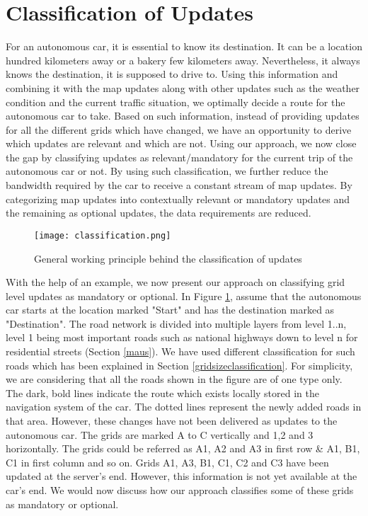 \section{Classification of Updates} \label{classificationofupdates}
For an autonomous car, it is essential to know its destination. It can be a location hundred kilometers away or a bakery few kilometers away. Nevertheless, it always knows the destination, it is supposed to drive to. Using this information and combining it with the map updates along with other updates such as the weather condition and the current traffic situation, we optimally decide a route for the autonomous car to take. Based on such information, instead of providing updates for all the different grids which have changed, we have an opportunity to derive which updates are relevant and which are not. Using our approach, we now close the gap by classifying updates as relevant/mandatory for the current trip of the autonomous car or not. By using such classification, we further reduce the bandwidth required by the car to receive a constant stream of map updates. By categorizing map updates into contextually relevant or mandatory updates and the remaining as optional updates, the data requirements are reduced. \\

\begin{figure}
\centering
\texttt{[image: classification.png]}
\caption{General working principle behind the classification of updates}
\label{fg:classificationofmapupdate}
\end{figure}

With the help of an example, we now present our approach on classifying grid level updates as mandatory or optional. In Figure \ref{fg:classificationofmapupdate}, assume that the autonomous car starts at the location marked "Start" and has the destination marked as "Destination". The road network is divided into multiple layers from level 1..n, level 1 being most important roads such as national highways down to level n for residential streets (Section \ref{maus}). We have used different classification for such roads which has been explained in Section \ref{gridsizeclassification}. For simplicity, we are considering that all the roads shown in the figure are of one type only. The dark, bold lines indicate the route which exists locally stored in the navigation system of the car. The dotted lines represent the newly added roads in that area. However, these changes have not been delivered as updates to the autonomous car. The grids are marked A to C vertically and 1,2 and 3 horizontally. The grids could be referred as A1, A2 and A3 in first row \& A1, B1, C1 in first column and so on. Grids A1, A3, B1, C1, C2 and C3 have been updated at the server's end. However, this information is not yet available at the car's end. We would now discuss how our approach classifies some of these grids as mandatory or optional.
